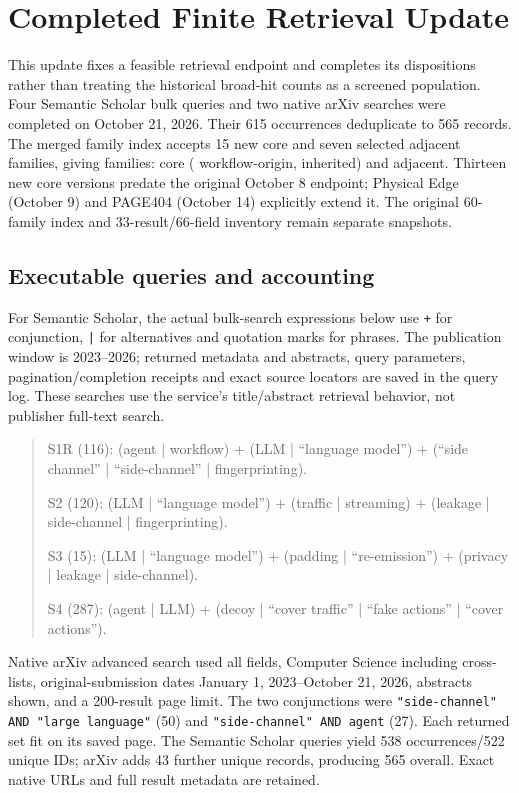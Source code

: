 \section{Completed Finite Retrieval Update}\label{app:search-update}
This update fixes a feasible retrieval endpoint and completes its dispositions rather than treating the historical broad-hit counts as a screened population. Four Semantic Scholar bulk queries and two native arXiv searches were completed on October 21, 2026. Their 615 occurrences deduplicate to 565 records. The merged family index accepts 15 new core and seven selected adjacent families, giving \FinalN{} families: \FinalCore{} core (\FinalA{} workflow-origin, \FinalB{} inherited) and \FinalAdjacent{} adjacent. Thirteen new core versions predate the original October 8 endpoint; Physical Edge (October 9) and PAGE404 (October 14) explicitly extend it. The original 60-family index and 33-result/66-field inventory remain separate snapshots.

\subsection{Executable queries and accounting}
For Semantic Scholar, the actual bulk-search expressions below use \texttt{+} for conjunction, \texttt{|} for alternatives and quotation marks for phrases. The publication window is 2023--2026; returned metadata and abstracts, query parameters, pagination/completion receipts and exact source locators are saved in the query log. These searches use the service's title/abstract retrieval behavior, not publisher full-text search.
\begin{quote}\small\raggedright
S1R (116): (agent | workflow) + (LLM | ``language model'') + (``side channel'' | ``side-channel'' | fingerprinting).

S2 (120): (LLM | ``language model'') + (traffic | streaming) + (leakage | side-channel | fingerprinting).

S3 (15): (LLM | ``language model'') + (padding | ``re-emission'') + (privacy | leakage | side-channel).

S4 (287): (agent | LLM) + (decoy | ``cover traffic'' | ``fake actions'' | ``cover actions'').
\end{quote}
Native arXiv advanced search used all fields, Computer Science including cross-lists, original-submission dates January 1, 2023--October 21, 2026, abstracts shown, and a 200-result page limit. The two conjunctions were \texttt{"side-channel" AND "large language"} (50) and \texttt{"side-channel" AND agent} (27). Each returned set fit on its saved page. The Semantic Scholar queries yield 538 occurrences/522 unique IDs; arXiv adds 43 further unique records, producing 565 overall. Exact native URLs and full result metadata are retained.

